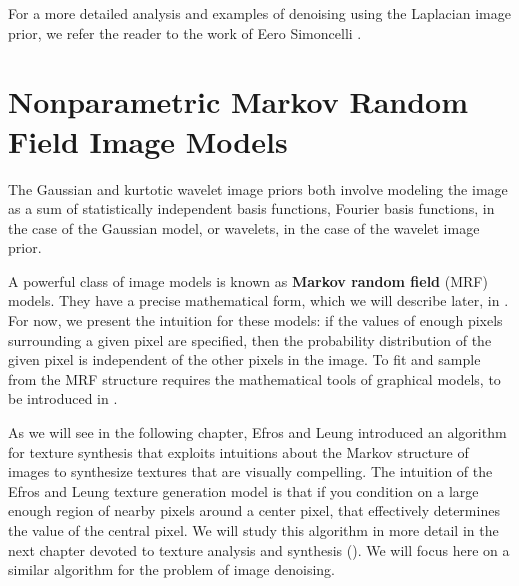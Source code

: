 For a more detailed analysis and examples of denoising using the Laplacian image prior, we refer the reader to the work of Eero Simoncelli \cite{Simoncelli96}.

\section{Nonparametric Markov Random Field Image Models}

The Gaussian and kurtotic wavelet image priors both involve modeling the image as a sum of statistically independent basis functions, Fourier basis functions, in the case of the Gaussian model, or wavelets, in the case of  the wavelet image prior. 

A powerful class of image models is known as {\bf Markov random field} (MRF) models.  They have a precise mathematical form, which we will describe later, in \chap{\ref{chapter:probabilistic_graphical_models}}.  For now, we present the intuition for these models:  if the values of enough pixels surrounding a given pixel are specified, then the probability distribution of the given pixel is independent of the other pixels in the image.  To fit and sample from the MRF structure requires the mathematical tools of graphical models, to be introduced in \chap{\ref{chapter:probabilistic_graphical_models}}.




As we will see in the following chapter,  Efros and Leung \cite{Efros99} introduced an algorithm for texture synthesis that exploits intuitions about the Markov structure of images to synthesize textures that are visually compelling.
The intuition of the Efros and Leung texture generation model is that if you condition on a large enough region of nearby pixels around a center pixel, that effectively determines the value of the central pixel. We will study this algorithm in more detail in the next chapter devoted to texture analysis and synthesis (\chap{\ref{chap:textures}}). We will focus here on a similar algorithm for the problem of image denoising.  

